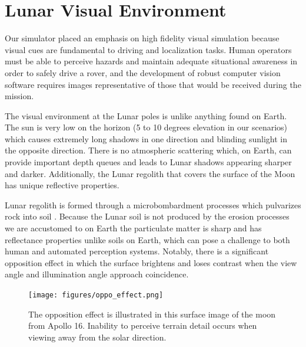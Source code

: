 \documentclass[twocolumn,letterpaper]{IEEEAerospaceCLS}  %
\begin{document}
\section{Lunar Visual Environment}
\label{sec:visual-env}

Our simulator placed an emphasis on high fidelity visual simulation because visual cues are fundamental to driving and localization tasks. 
Human operators must be able to perceive hazards and maintain adequate situational awareness in order to safely drive a rover, and the development of robust computer vision software requires images representative of those that would be received during the mission. 

The visual environment at the Lunar poles is unlike anything found on Earth. 
The sun is very low on the horizon (5 to 10 degrees elevation in our scenarios) which causes extremely long shadows in one direction and blinding sunlight in the opposite direction. 
There is no atmospheric scattering which, on Earth, can provide important depth queues \cite{fry1949effects} and leads to Lunar shadows appearing sharper and darker.
Additionally, the Lunar regolith that covers the surface of the Moon has unique reflective properties. 

Lunar regolith is formed through a microbombardment processes which pulvarizes rock into soil \cite{lunarsourcebook}. Because the Lunar soil is not produced by the erosion processes we are accustomed to on Earth the particulate matter is sharp and has reflectance properties unlike soils on Earth, which can pose a challenge to both human and automated perception systems. 
Notably, there is a significant opposition effect \cite{hapke1986bidirectional} in which the surface brightens and loses contrast when the view angle and illumination angle approach coincidence.

\begin{figure}[h!]
  \texttt{[image: figures/oppo\_effect.png]}
    \caption{The opposition effect is illustrated in this surface image of the moon from Apollo 16. Inability to perceive terrain detail occurs when viewing away from the solar direction.}
    \label{fig:oppo_effect}
\end{figure}
\end{document}
